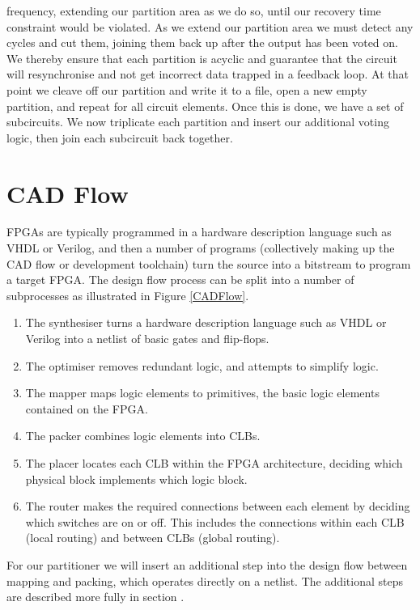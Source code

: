 \documentclass[12pt,final,oneside]{dwThesis} %
\begin{document}
   frequency, extending our partition area as we do so, until our recovery time
   constraint would be violated.  As we extend our partition area we must
   detect any cycles and cut them, joining them back up after the output has
   been voted on. We thereby ensure that each partition is acyclic and
   guarantee that the circuit will resynchronise and not get incorrect data
   trapped in a feedback loop.  At that point we cleave off our partition and
   write it to a file, open a new empty partition, and repeat for all circuit
   elements.  Once this is done, we have a set of subcircuits. We now
   triplicate each partition and insert our additional voting logic, then join
   each subcircuit back together.

   \section{\gls{CAD}
      Flow} \glspl{FPGA} are typically programmed
   in a hardware description language such as \gls{VHDL} or Verilog, and then a
   number of programs (collectively making up the \gls{CAD} flow or development
   toolchain) turn the source into a bitstream to program a target \gls{FPGA}.
   The design flow process can be split into a number of
   subprocesses as illustrated in Figure
   \ref{CADFlow}\cite{VPRBook,VPRManual,FPGAArch}.  
   \begin{enumerate}

      \item The synthesiser turns a hardware description language such as VHDL
         or Verilog into a netlist of basic gates and flip-flops.
      \item The optimiser removes redundant logic, and attempts to simplify
         logic.
      \item The mapper maps logic elements to \glspl{primitive}, the basic
         logic elements contained on the \gls{FPGA}.
      \item The packer combines logic elements into \glspl{CLB}.
      \item The placer locates each \gls{CLB} within the \gls{FPGA}
         architecture, deciding which physical block implements which logic
         block.
      \item The router makes the required connections between each element by
         deciding which switches are on or off. This includes the
         connections within each \gls{CLB} (local routing) and between
         \glspl{CLB} (global routing).  
   \end{enumerate}
   For our partitioner
   we will insert an additional step into the design flow between mapping
   and packing, which operates directly on a netlist. The additional steps
   are described more fully in section .
\end{document}
